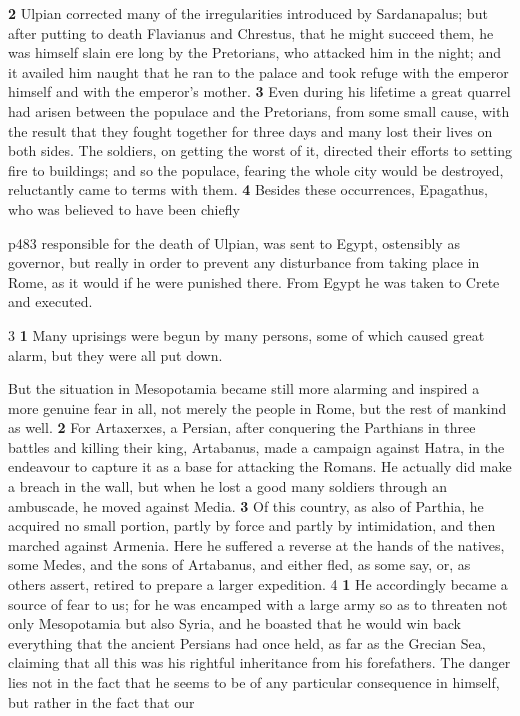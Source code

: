 \textbf{2}
Ulpian corrected many of the irregularities introduced by Sardanapalus; but after putting to death Flavianus and Chrestus, that he might succeed them, he was himself slain ere long by the Pretorians, who attacked him in the night; and it availed him naught that he ran to the palace and took refuge with the emperor himself and with the emperor's mother. \textbf{3} Even during his lifetime a great quarrel had arisen between the populace and the Pretorians, from some small cause, with the result that they fought together for three days and many lost their lives on both sides. The soldiers, on getting the worst of it, directed their efforts to setting fire to buildings; and so the populace, fearing the whole city would be destroyed, reluctantly came to terms with them. \textbf{4} Besides these occurrences, Epagathus, who was believed to have been chiefly

p483 responsible for the death of Ulpian, was sent to Egypt, ostensibly as governor, but really in order to prevent any disturbance from taking place in Rome, as it would if he were punished there. From Egypt he was taken to Crete and executed.

3 \textbf{1} Many uprisings were begun by many persons, some of which caused great alarm, but they were all put down.

But the situation in Mesopotamia became still more alarming and inspired a more genuine fear in all, not merely the people in Rome, but the rest of mankind as well. \textbf{2} For Artaxerxes, a Persian, after conquering the Parthians in three battles and killing their king, Artabanus, made a campaign against Hatra, in the endeavour to capture it as a base for attacking the Romans. He actually did make a breach in the wall, but when he lost a good many soldiers through an ambuscade, he moved against Media. \textbf{3} Of this country, as also of Parthia, he acquired no small portion, partly by force and partly by intimidation, and then marched against Armenia. Here he suffered a reverse at the hands of the natives, some Medes, and the sons of Artabanus, and either fled, as some say, or, as others assert, retired to prepare a larger expedition. 4 \textbf{1} He accordingly became a source of fear to us; for he was encamped with a large army so as to threaten not only Mesopotamia but also Syria, and he boasted that he would win back everything that the ancient Persians had once held, as far as the Grecian Sea, claiming that all this was his rightful inheritance from his forefathers. The danger lies not in the fact that he seems to be of any particular consequence in himself, but rather in the fact that our

